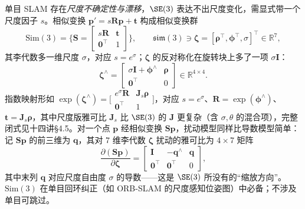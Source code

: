 单目 SLAM 存在\emph{尺度不确定性与漂移}，$\SE(3)$ 表达不出尺度变化，需显式带一个尺度因子 $s$。相似变换 $\mathbf{p}'=s\mathbf{R}\mathbf{p}+\mathbf{t}$ 构成相似变换群
\begin{equation}
  \mathrm{Sim}(3)=\Big\{\mathbf{S}=\begin{bmatrix}s\mathbf{R}&\mathbf{t}\\\mathbf{0}^\top&1\end{bmatrix}\Big\},\qquad
  \mathfrak{sim}(3)\ni\boldsymbol{\zeta}=[\boldsymbol{\rho}^\top,\boldsymbol{\phi}^\top,\sigma]^\top\in\mathbb{R}^7,
  \label{eq:sim3}
\end{equation}
其李代数多一维尺度 $\sigma$，对应 $s=e^{\sigma}$；$\boldsymbol{\zeta}$ 的反对称化在旋转块上多了一项 $\sigma\mathbf{I}$：
\begin{equation}
  \boldsymbol{\zeta}^\wedge=\begin{bmatrix}\sigma\mathbf{I}+\boldsymbol{\phi}^\wedge&\boldsymbol{\rho}\\\mathbf{0}^\top&0\end{bmatrix}\in\mathbb{R}^{4\times4}.
  \label{eq:sim3-hat}
\end{equation}
指数映射形如 $\exp(\boldsymbol{\zeta}^\wedge)=\big[\begin{smallmatrix}e^{\sigma}\mathbf{R}&\mathbf{J}_s\boldsymbol{\rho}\\\mathbf{0}^\top&1\end{smallmatrix}\big]$，对应 $s=e^\sigma$、$\mathbf{R}=\exp(\boldsymbol{\phi}^\wedge)$、$\mathbf{t}=\mathbf{J}_s\boldsymbol{\rho}$，其中尺度版雅可比 $\mathbf{J}_s$ 比 $\SE(3)$ 的 $\mathbf{J}$ 更复杂（含 $\sigma,\theta$ 的混合项），完整闭式见十四讲\cite{gaoxiang2019slam14}§4.5。对一个点 $\mathbf{p}$ 经相似变换 $\mathbf{S}\mathbf{p}$，扰动模型同样比导数模型简单：记 $\mathbf{S}\mathbf{p}$ 的前三维为 $\mathbf{q}$，其对 $7$ 维李代数 $\boldsymbol{\zeta}$ 扰动的雅可比为 $4\times7$ 矩阵
\begin{equation}
  \frac{\partial(\mathbf{S}\mathbf{p})}{\partial\boldsymbol{\zeta}}
  =\begin{bmatrix}\mathbf{I}&-\mathbf{q}^\wedge&\mathbf{q}\\\mathbf{0}^\top&\mathbf{0}^\top&0\end{bmatrix},
  \label{eq:sim3-pert}
\end{equation}
其中末列 $\mathbf{q}$ 对应尺度自由度 $\sigma$ 的导数——这是 $\SE(3)$ 所没有的“缩放方向”。$\mathrm{Sim}(3)$ 在单目回环纠正（如 ORB-SLAM 的尺度感知位姿图）中必备；不涉及单目可跳过。

